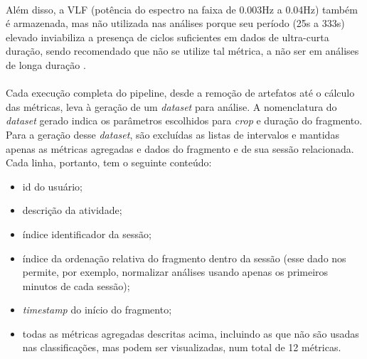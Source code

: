             \paragraph{} Além disso, a VLF (potência do espectro na faixa de 0.003Hz a 0.04Hz) também é armazenada, mas não utilizada nas análises porque seu período (25s a 333s) elevado inviabiliza a presença de ciclos suficientes em dados de ultra-curta duração, sendo recomendado que não se utilize tal métrica, a não ser em análises de longa duração \cite{TaskForceoftheEuropeanSocietyofCardiologytheNorthAmericanSocietyofPacing1996HeartUse}.
        
           \paragraph{} Cada execução completa do pipeline, desde a remoção de artefatos até o cálculo das métricas, leva à geração de um \textit{dataset} para análise. A nomenclatura do \textit{dataset} gerado indica os parâmetros escolhidos para \textit{crop} e duração do fragmento. Para a geração desse \textit{dataset}, são excluídas as listas de intervalos e mantidas apenas as métricas agregadas e dados do fragmento e de sua sessão relacionada. Cada linha, portanto, tem o seguinte conteúdo:
                \begin{itemize}
                    \item id do usuário;
                    \item descrição da atividade;
                    \item índice identificador da sessão;
                    \item índice da ordenação relativa do fragmento dentro da sessão (esse dado nos permite, por exemplo, normalizar análises usando apenas os primeiros minutos de cada sessão);
                    \item \textit{timestamp} do início do fragmento;
                    \item todas as métricas agregadas descritas acima, incluindo as que não são usadas nas classificações, mas podem ser visualizadas, num total de 12 métricas.
                \end{itemize}
                
        
        
